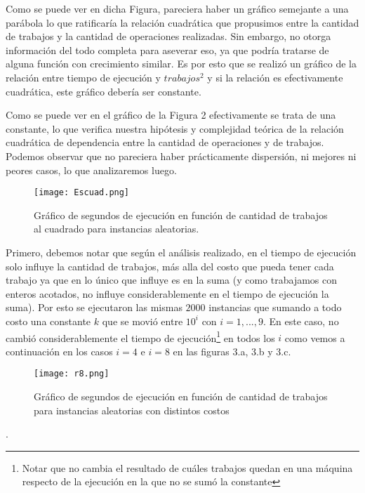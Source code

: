 \documentclass[A4paper,oneside,fleqn,11pt]{article}
\theoremstyle{definition}
\begin{document}
Como se puede ver en dicha Figura, pareciera haber un gráfico semejante a una parábola lo que ratificaría la relación cuadrática que propusimos entre la cantidad de trabajos y la cantidad de operaciones realizadas. Sin embargo, no otorga información del todo completa para aseverar eso, ya que podría tratarse de alguna función con crecimiento similar. Es por esto que se realizó un gráfico de la relación entre tiempo de ejecución y $trabajos^2$ y si la relación es efectivamente cuadrática, este gráfico debería ser constante.

Como se puede ver en el gráfico de la Figura 2 efectivamente se trata de una constante, lo que verifica nuestra hipótesis y complejidad teórica de la relación cuadrática de dependencia entre la cantidad de operaciones y de trabajos. Podemos observar que no pareciera haber prácticamente dispersión, ni mejores ni peores casos, lo que analizaremos luego.

\break

\begin{wrapfigure}[10]{L}{0.25\textwidth}
	\texttt{[image: Escuad.png]}
	\caption{ Gráfico de segundos de ejecución en función de cantidad de trabajos al cuadrado para instancias aleatorias.}
\end{wrapfigure}

Primero, debemos notar que según el análisis realizado, en el tiempo de ejecución solo influye la cantidad de trabajos, más alla del costo que pueda tener cada trabajo ya que en lo único que influye es en la suma (y como trabajamos con enteros acotados, no influye considerablemente en el tiempo de ejecución la suma). Por esto se ejecutaron las mismas $2000$ instancias que sumando a todo costo una constante $k$ que se movió entre $10^i$ con $i=1,...,9$. En este caso, no cambió considerablemente el tiempo de ejecución\footnote{Notar que no cambia el resultado de cuáles trabajos quedan en una máquina respecto de la ejecución en la que no se sumó la constante} en todos los $i$ como vemos a continuación en los casos $i=4$ e $i=8$ en las figuras 3.a, 3.b y 3.c.

\vspace{8mm}

\begin{figure}[H]
	\captionsetup[subfigure]{position=b}
	\centering
	
		{\texttt{[image: r8.png]}}
	\caption{Gráfico de segundos de ejecución en función de cantidad de trabajos para instancias aleatorias con distintos costos}
\end{figure}
.
\end{document}
